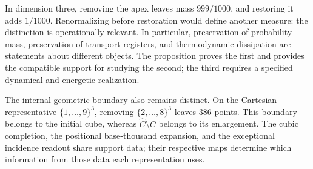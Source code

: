 In dimension three, removing the apex leaves mass \(999/1000\), and
restoring it adds \(1/1000\). Renormalizing before restoration
would define another measure: the distinction is operationally relevant.
In particular, preservation of probability mass, preservation of transport
registers, and thermodynamic dissipation are statements about
different objects. The proposition proves the first and provides the
compatible support for studying the second; the third requires a
specified dynamical and energetic realization.

The internal geometric boundary also remains distinct.
On the Cartesian representative \(\{1,\ldots,9\}^3\), removing
\(\{2,\ldots,8\}^3\) leaves \(386\) points. This boundary belongs to the
initial cube, whereas \(\widehat C\setminus C\) belongs to its
enlargement. The cubic completion, the positional base-thousand expansion, and
the exceptional incidence readout share support data;
their respective maps determine which information from those data
each representation uses.
